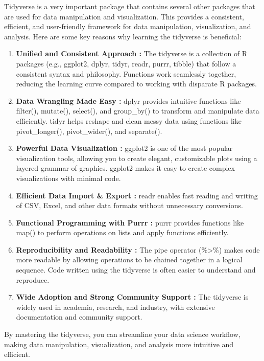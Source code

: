 \documentclass[
  letterpaper,
  DIV=11,
  numbers=noendperiod]{scrreprt}
\begin{document}
Tidyverse is a very important package that contains several other
packages that are used for data manipulation and visualization. This
provides a consistent, efficient, and user-friendly framework for data
manipulation, visualization, and analysis. Here are some key reasons why
learning the tidyverse is beneficial:

\begin{enumerate}
\def\labelenumi{\arabic{enumi}.}
\item
  \textbf{Unified and Consistent Approach :} The tidyverse is a
  collection of R packages (e.g., ggplot2, dplyr, tidyr, readr, purrr,
  tibble) that follow a consistent syntax and philosophy. Functions work
  seamlessly together, reducing the learning curve compared to working
  with disparate R packages.
\item
  \textbf{Data Wrangling Made Easy :} dplyr provides intuitive functions
  like filter(), mutate(), select(), and group\_by() to transform and
  manipulate data efficiently. tidyr helps reshape and clean messy data
  using functions like pivot\_longer(), pivot\_wider(), and separate().
\item
  \textbf{Powerful Data Visualization :} ggplot2 is one of the most
  popular visualization tools, allowing you to create elegant,
  customizable plots using a layered grammar of graphics. ggplot2 makes
  it easy to create complex visualizations with minimal code.
\item
  \textbf{Efficient Data Import \& Export :} readr enables fast reading
  and writing of CSV, Excel, and other data formats without unnecessary
  conversions.
\item
  \textbf{Functional Programming with Purrr :} purrr provides functions
  like map() to perform operations on lists and apply functions
  efficiently.
\item
  \textbf{Reproducibility and Readability :} The pipe operator
  (\%\textgreater\%) makes code more readable by allowing operations to
  be chained together in a logical sequence. Code written using the
  tidyverse is often easier to understand and reproduce.
\item
  \textbf{Wide Adoption and Strong Community Support :} The tidyverse is
  widely used in academia, research, and industry, with extensive
  documentation and community support.
\end{enumerate}

By mastering the tidyverse, you can streamline your data science
workflow, making data manipulation, visualization, and analysis more
intuitive and efficient.
\end{document}
